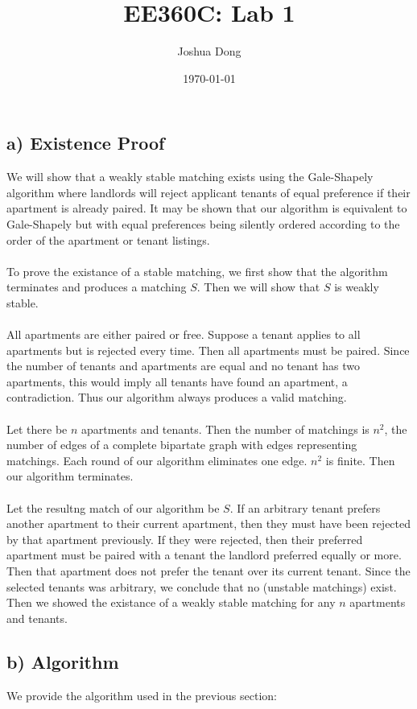 \documentclass{article}
\begin{document}
\title{EE360C: Lab 1}
\author{Joshua Dong}
\date{\today}
\maketitle

\subsection*{a) Existence Proof}
We will show that a weakly stable matching exists using the Gale-Shapely
algorithm where landlords will reject applicant tenants of equal preference if
their apartment is already paired. It may be shown that our algorithm is
equivalent to Gale-Shapely but with equal preferences being silently ordered
according to the order of the apartment or tenant listings.
\\\\
To prove the existance of a stable matching, we first show that the algorithm
terminates and produces a matching $S$. Then we will show that $S$ is weakly
stable.
\\\\
All apartments are either paired or free. Suppose a tenant applies to all
apartments but is rejected every time. Then all apartments must be paired.
Since the number of tenants and apartments are equal and no tenant has
two apartments, this would imply all tenants have found an apartment,
a contradiction. Thus our algorithm always produces a valid matching.
\\\\
Let there be $n$ apartments and tenants. Then the number of matchings is
$n^2$, the number of edges of a complete bipartate graph with edges
representing matchings. Each round of our algorithm eliminates one edge.
$n^2$ is finite. Then our algorithm terminates.
\\\\
Let the resultng match of our algorithm be $S$. If an arbitrary tenant prefers
another apartment to their current apartment, then they must have been
rejected by that apartment previously. If they were rejected, then their
preferred apartment must be paired with a tenant the landlord preferred
equally or more. Then that apartment does not prefer the tenant over its
current tenant. Since the selected tenants was arbitrary, we conclude that
no (unstable matchings) exist. Then we showed the existance of a weakly stable
matching for any $n$ apartments and tenants.


\newpage
\subsection*{b) Algorithm}
We provide the algorithm used in the previous section:
\end{document}
